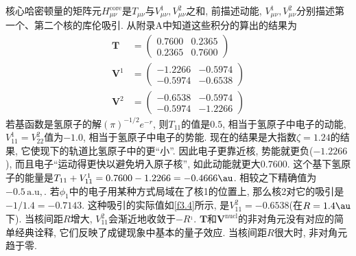
核心哈密顿量的矩阵元$H_{\mu\nu}^\mathrm{core}$是$T_{\mu\nu}$与$V_{\mu\nu}^1,V_{\mu\nu}^2$之和, 
前描述动能, 
$V_{\mu\nu}^1,V_{\mu\nu}^2$分别描述第一个、第二个核的库伦吸引. 
从附录A中知道这些积分的算出的结果为
\begin{align}
	\mathbf{T} & = 
	\begin{pmatrix}
		0.7600&0.2365\\0.2365&0.7600
	\end{pmatrix}\\
	\mathbf{V}^1 & = 
	\begin{pmatrix}
		-1.2266&-0.5974\\-0.5974&-0.6538
	\end{pmatrix}\\
	\mathbf{V}^2 & = 
	\begin{pmatrix}
		-0.6538&-0.5974\\-0.5974&-1.2266
	\end{pmatrix}
\end{align}
若基函数是氢原子的解$(\pi)^{-1/2}e^{-r}$, 
则$T_{11}$的值是$0.5$, 
相当于氢原子中电子的动能, 
$V_{11}^1=V_{22}^2$值为$-1.0$, 
相当于氢原子中电子的势能. 
现在的结果是大指数$\zeta=1.24$的结果, 
它使现下的轨道比氢原子中的更``小”. 
因此电子更靠近核, 
势能就更负($-1.2266$), 
而且电子``运动得更快以避免坍入原子核”, 
如此动能就更大$0.7600$. 
这个基下氢原子的能量是$T_{11}+V_{11}^1=0.7600-1.2266=-0.4666\au$. 
相较之下精确值为$-0.5\,\mathrm{a.u,}$. 
若$\phi_1$中的电子用某种方式局域在了核1的位置上, 
那么核2对它的吸引是$-1/1.4=-0.7143$. 
这种吸引的实际值如\autoref{f3.4}所示, 
是$V_{11}^2=-0.6538$(在$R=1.4\au$下). 
当核间距$R$增大, 
$V_{11}^2$会渐近地收敛于$-R^{_1}$. 
$\mathbf{T}$和$\mathbf{V}^\mathrm{nucl}$的非对角元没有对应的简单经典诠释, 
它们反映了成键现象中基本的量子效应. 
当核间距$R$很大时, 
非对角元趋于零.


